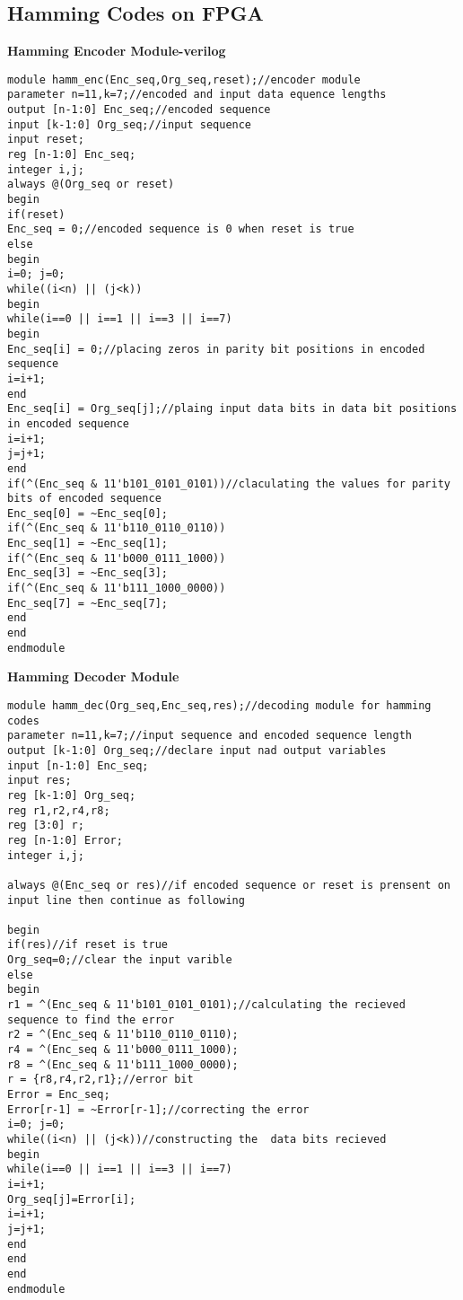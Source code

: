 \documentclass[14pt]{report}
\begin{document}
{\subsection{Hamming Codes on FPGA}
\textbf{Hamming Encoder Module-verilog}\\
\begin{verbatim}
module hamm_enc(Enc_seq,Org_seq,reset);//encoder module
parameter n=11,k=7;//encoded and input data equence lengths
output [n-1:0] Enc_seq;//encoded sequence
input [k-1:0] Org_seq;//input sequence
input reset;
reg [n-1:0] Enc_seq;
integer i,j;
always @(Org_seq or reset)
begin
if(reset)
Enc_seq = 0;//encoded sequence is 0 when reset is true
else
begin
i=0; j=0;
while((i<n) || (j<k))
begin
while(i==0 || i==1 || i==3 || i==7)
begin
Enc_seq[i] = 0;//placing zeros in parity bit positions in encoded sequence
i=i+1;
end
Enc_seq[i] = Org_seq[j];//plaing input data bits in data bit positions in encoded sequence
i=i+1;
j=j+1;
end
if(^(Enc_seq & 11'b101_0101_0101))//claculating the values for parity bits of encoded sequence
Enc_seq[0] = ~Enc_seq[0];
if(^(Enc_seq & 11'b110_0110_0110))
Enc_seq[1] = ~Enc_seq[1];
if(^(Enc_seq & 11'b000_0111_1000))
Enc_seq[3] = ~Enc_seq[3];
if(^(Enc_seq & 11'b111_1000_0000))
Enc_seq[7] = ~Enc_seq[7];
end
end
endmodule

\end{verbatim}
\textbf{Hamming Decoder Module}\\
\begin{verbatim}
module hamm_dec(Org_seq,Enc_seq,res);//decoding module for hamming codes
parameter n=11,k=7;//input sequence and encoded sequence length
output [k-1:0] Org_seq;//declare input nad output variables
input [n-1:0] Enc_seq;
input res;
reg [k-1:0] Org_seq;
reg r1,r2,r4,r8;
reg [3:0] r;
reg [n-1:0] Error;
integer i,j;

always @(Enc_seq or res)//if encoded sequence or reset is prensent on input line then continue as following

begin
if(res)//if reset is true
Org_seq=0;//clear the input varible
else
begin
r1 = ^(Enc_seq & 11'b101_0101_0101);//calculating the recieved sequence to find the error
r2 = ^(Enc_seq & 11'b110_0110_0110);
r4 = ^(Enc_seq & 11'b000_0111_1000);
r8 = ^(Enc_seq & 11'b111_1000_0000);
r = {r8,r4,r2,r1};//error bit
Error = Enc_seq;
Error[r-1] = ~Error[r-1];//correcting the error
i=0; j=0;
while((i<n) || (j<k))//constructing the  data bits recieved
begin
while(i==0 || i==1 || i==3 || i==7)
i=i+1;
Org_seq[j]=Error[i];
i=i+1;
j=j+1;
end
end
end
endmodule


\end{verbatim}}
\end{document}
